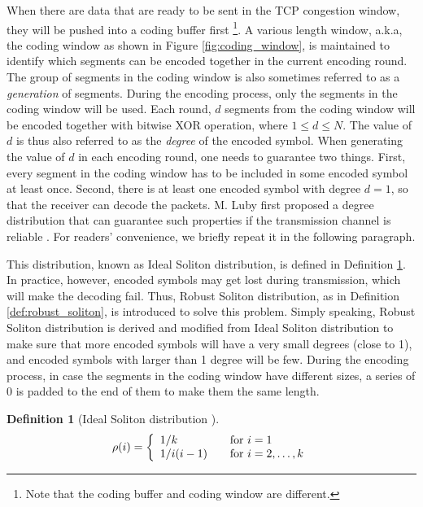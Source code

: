 \documentclass[10pt, conference, final, letterpaper]{IEEEtran}
\theoremstyle{definition}
\newtheorem{defn}{Definition}[section]
\begin{document}
When there are data that are ready to be sent in the TCP congestion window, they will be pushed into a coding buffer first \footnote{Note that the coding buffer and coding window are different.}. A various length window, a.k.a, the coding window as shown in Figure \ref{fig:coding_window}, is maintained to identify which segments can be encoded together in the current encoding round. The group of segments in the coding window is also sometimes referred to as a \textit{generation} of segments. During the encoding process, only the segments in the coding window will be used. Each round, $d$ segments from the coding window will be encoded together with bitwise XOR operation, where $1 \le d \le N$. The value of $d$ is thus also referred to as the \textit{degree} of the encoded symbol. When generating the value of $d$ in each encoding round, one needs to guarantee two things. First, every segment in the coding window has to be included in some encoded symbol at least once. Second, there is at least one encoded symbol with degree $d = 1$, so that the receiver can decode the packets. M. Luby first proposed a degree distribution that can guarantee such properties if the transmission channel is reliable \cite{ltcodes}. For readers' convenience, we briefly repeat it in the following paragraph.

This distribution, known as Ideal Soliton distribution, is defined in Definition \ref{def:ideal_soliton}. In practice, however, encoded symbols may get lost during transmission, which will make the decoding fail. Thus, Robust Soliton distribution, as in Definition \ref{def:robust_soliton}, is introduced to solve this problem. Simply speaking, Robust Soliton distribution is derived and modified from Ideal Soliton distribution to make sure that more encoded symbols will have a very small degrees (close to 1), and encoded symbols with larger than 1 degree will be few. During the encoding process, in case the segments in the coding window have different sizes, a series of $0$ is padded to the end of them to make them the same length.

\begin{defn}[Ideal Soliton distribution \cite{ltcodes}]\label{def:ideal_soliton}
	\begin{align}
	\rho(i) = \left\{
		\begin{array}{l l}
			1/k & \quad \text{for $i = 1$} \\
			1/{i(i-1)} & \quad \text{for $i = 2, \dots, k$}
		\end{array} \right.
	\end{align}
\end{defn}
\end{document}
